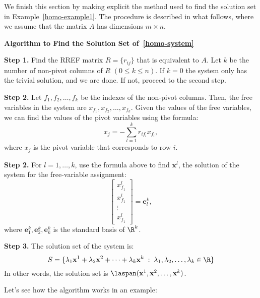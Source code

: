 \documentclass[12pt]{article}
\begin{document}
We finish this section by making explicit the method used to find the solution set in Example~\ref{homo-example1}. The procedure is described in what follows, where we assume that the matrix $A$ has dimensions $m\times n$.

\textbf{Algorithm to Find the Solution Set of~\ref{homo-system}}

\textbf{Step 1.} Find the RREF matrix $R=\{r_{ij}\}$ that is equivalent to $A$. Let $k$ be the number of non-pivot columns of $R$ $(0\le k\le n)$. If $k=0$ the system only has the trivial solution, and we are done. If not, proceed to the second step.

\textbf{Step 2.} Let $f_1, f_2,\ldots,f_k$ be the indexes of the non-pivot columns. Then, the free variables in the system are $x_{f_1},x_{f_2},\ldots,x_{f_k}$. Given the values of the free variables, we can find the values of the pivot variables using the formula:
\[
x_j=-\sum_{l=1}^{k}r_{if_l}x_{f_l},
\]
where $x_j$ is the pivot variable that corresponds to row $i$.

\textbf{Step 2.} For $l=1,\ldots,k$, use the formula above to find $\textbf{x}^l$, the solution of the system for the free-variable assignment:
\[
\begin{bmatrix}x^l_{f_1}\\x^l_{f_1}\\\vdots\\x^l_{f_1}\end{bmatrix}=\mathbf{e}^k_l,
\] 
where $\mathbf{e}^k_1,\mathbf{e}^k_2,\mathbf{e}^k_k$ is the standard basis of $\R^k$.

\textbf{Step 3.} The solution set of the system is:
\[
S=\{\lambda_1\textbf{x}^1+\lambda_2\textbf{x}^2+\cdots+\lambda_k\textbf{x}^k
\;:\; \lambda_1,\lambda_2,\ldots,\lambda_k\in\R\}
\]
In other words, the solution set is $\laspan(\mathbf{x}^1,\mathbf{x}^2,\ldots,\mathbf{x}^k)$.

Let's see how the algorithm works in an example:
\end{document}
